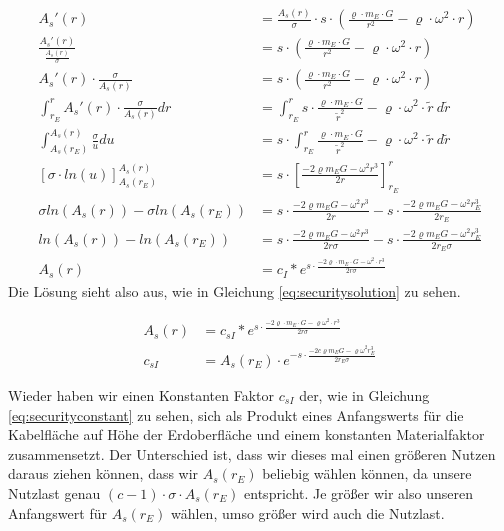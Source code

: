 \documentclass[a4paper, 10pt]{report}
\begin{document}
\begin{align*}
A_s'(r) &= \frac{A_s(r)}{\sigma} \cdot s \cdot (\frac{\varrho\cdot m_E \cdot G}{r^2} - \varrho \cdot \omega^2 \cdot r)\\
\frac{A_s'(r)}{\frac{A_s(r)}{\sigma}} &= s \cdot(\frac{\varrho\cdot m_E \cdot G}{r^2} - \varrho \cdot \omega^2 \cdot r)\\
A_s'(r) \cdot \frac{\sigma}{A_s(r)} &= s \cdot (\frac{\varrho\cdot m_E \cdot G}{r^2} - \varrho \cdot \omega^2 \cdot r)\\
\int_{r_E}^{r} A_s'(r) \cdot \frac{\sigma}{A_s(r)} dr &=  \int_{r_E}^{r} s \cdot \frac{\varrho\cdot m_E \cdot G}{\tilde{r}^2} - \varrho \cdot \omega^2 \cdot \tilde{r} \ d\tilde{r}\\
\int_{A_s(r_E)}^{A_s(r)} \frac{\sigma}{u} du &=  s \cdot \int_{r_E}^{r} \frac{\varrho\cdot m_E \cdot G}{\tilde{r}^2} - \varrho \cdot \omega^2 \cdot \tilde{r} \ d\tilde{r}\\
[\sigma \cdot ln(u)]_{A_s(r_E)}^{A_s(r)} &=  s \cdot [\frac{-2\varrho m_E G - \omega^2 r^3}{2 r}]_{r_E}^{r}\\
\sigma ln(A_s(r)) - \sigma ln(A_s(r_E)) &= s \cdot \frac{-2\varrho m_E G - \omega^2 r^3}{2 r} - s \cdot \frac{-2\varrho m_E G - \omega^2 r_E^3}{2 r_E}\\
ln(A_s(r)) - ln(A_s(r_E)) &= s \cdot \frac{-2\varrho m_E G - \omega^2 r^3}{2 r \sigma} - s \cdot \frac{-2\varrho m_E G - \omega^2 r_E^3}{2 r_E \sigma}\\
A_s(r) &= c_I * e^{s \cdot \frac{-2\varrho \cdot m_E \cdot G - \omega^2 \cdot r^3}{2 r \sigma}}
\end{align*}
Die Lösung sieht also aus, wie in Gleichung \ref{eq:securitysolution} zu sehen.

\begin{align}
A_s(r) &= c_{sI} * e^{s \cdot \frac{-2\varrho \cdot m_E \cdot G - \varrho \omega^2 \cdot r^3}{2 r \sigma}}\label{eq:securitysolution}\\
c_{sI} &= A_s(r_E) \cdot e^{- s \cdot \frac{-2 c \varrho m_E G - \varrho \omega^2 r_E^3}{2 r_E \sigma}}
\label{eq:securityconstant}
\end{align}

Wieder haben wir einen Konstanten Faktor $c_{sI}$ der, wie in Gleichung \ref{eq:securityconstant} zu sehen, sich als Produkt eines Anfangswerts für die Kabelfläche auf Höhe der Erdoberfläche und einem konstanten Materialfaktor zusammensetzt. Der Unterschied ist, dass wir dieses mal einen größeren Nutzen daraus ziehen können, dass wir $A_s(r_E)$ beliebig wählen können, da unsere Nutzlast genau $(c-1)\cdot \sigma \cdot A_s(r_E)$ entspricht. Je größer wir also unseren Anfangswert für $A_s(r_E)$ wählen, umso größer wird auch die Nutzlast.
\end{document}
